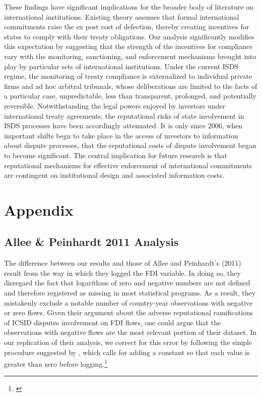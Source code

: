 \documentclass[12pt,onesided]{amsart}
\begin{document}
These findings have significant implications for the broader body of literature on international institutions. Existing theory assumes that formal international commitments raise the ex post cost of defection, thereby creating incentives for states to comply with their treaty obligations. Our analysis significantly modifies this expectation by suggesting that the strength of the incentives for compliance vary with the monitoring, sanctioning, and enforcement mechanisms brought into play by particular sets of international institutions. Under the current ISDS regime, the monitoring of treaty compliance is externalized to individual private firms and ad hoc arbitral tribunals, whose deliberations are limited to the facts of a particular case, unpredictable, less than transparent, prolonged, and potentially reversible. Notwithstanding the legal powers enjoyed by investors under international treaty agreements, the reputational risks of state involvement in ISDS processes have been accordingly attenuated. It is only since 2006, when important shifts begn to take place in the access of investors to information about dispute processes, that the reputational costs of dispute involvement began to become significant. The central implication for future research is that reputational mechanisms for effective enforcement of international commitments are contingent on institutional design and associated information costs.


\newpage






\newpage

\section*{Appendix}
\label{appendix}

\appendix
\setcounter{figure}{0} \renewcommand{\thefigure}{A.\arabic{figure}}
\setcounter{table}{0} \renewcommand{\thetable}{A.\arabic{table}}

\subsection*{Allee \& Peinhardt 2011 Analysis}

The difference between our results and those of Allee and Peinhardt's (2011) result from the way in which they logged the FDI variable. In doing so, they disregard the fact that logarithms of zero and negative numbers are not defined and therefore registered as missing in most statistical programs. As a result, they mistakenly exclude a notable number of country-year observations with negative or zero flows. Given their argument about the adverse reputational ramifications of ICSID disputes involvement on FDI flows, one could argue that the observations with negative flows are the most relevant portion of their dataset. In our replication of their analysis, we correct for this error by following the simple procedure suggested by \citeauthor{li:2009}, which calls for adding a constant so that each value is greater than zero before logging.\footnote{\citet{li:2009}} 
\end{document}

